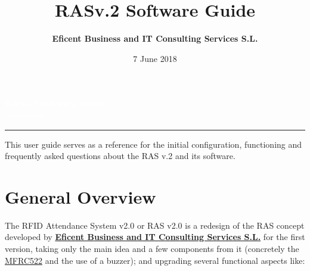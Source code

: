 \documentclass[12pt,a4paper,oneside]{article} %
\title{RASv.2 Software Guide}								%
\date{7 June 2018}											%
\author{%
    \textbf{Eficent Business and IT Consulting Services S.L.}%
    }
\makeatletter
\def\printauthor{%
    {\large \@author}}
\makeatother
\begin{document}

\begin{titlepage}
	\BgThispage
	\vspace*{0.4\textheight}
	\noindent
	\textcolor{white}{{\Huge\textbf{\textsf{RASv.2 Software Guide}}}\\ \vspace{15pt}\hspace{110pt} version one}
	\vspace*{2cm}\par
	\noindent
	\begin{minipage}{0.35\linewidth}
		\begin{flushright}
			\printauthor
		\end{flushright}
	\end{minipage} \hspace{15pt}
	\begin{minipage}{0.04\linewidth}
		\textcolor{titlepagecolor}{\rule{2pt}{250pt}}
	\end{minipage} \hspace{20pt}
	\begin{minipage}{0.8\linewidth}
		\vspace{5pt}
		This user guide serves as a reference for the initial configuration, functioning and frequently asked questions about the RAS v.2 and its software. 
	\end{minipage}
\end{titlepage}
\restoregeometry


\tableofcontents
\pagebreak


\section{General Overview}

The RFID Attendance System v2.0 or RAS v2.0 is a redesign of the RAS concept developed by \textbf{\href{http://www.eficent.com/about-us/}{Eficent Business and IT Consulting Services S.L.}} \citep{eficent}for the first version, taking only the main idea and a few components from it (concretely the \href{https://www.nxp.com/docs/en/data-sheet/MFRC522.pdf}{MFRC522} \citep{rfid} and the use of a buzzer); and upgrading several functional aspects like:
\end{document}
